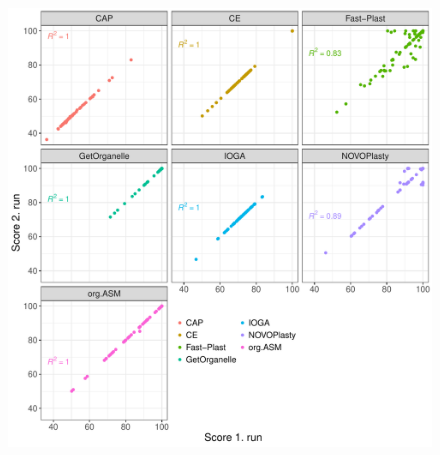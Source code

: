 \documentclass{bmcart}
\begin{document}
\begin{backmatter}
\begin{figure}[h!]
  \includegraphics[width=\textwidth]{plots/repro.pdf}
  \caption{
      }
      \label{fig:reproducibility}
      \end{figure}


\end{backmatter}
\end{document}
